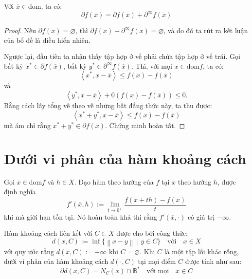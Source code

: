 \begin{lemma}
    Với $\overline{x} \in \text{dom}$, ta có:
    \begin{equation}
        \partial f(\overline{x}) = \partial f(\overline{x}) + \partial^{\infty}f(\overline{x})
    \end{equation}
\end{lemma}
\begin{proof}
    Nếu $\partial f(\overline{x}) = \varnothing$, thì $\partial f(\overline{x}) + \partial^{\infty}f(\overline{x}) = \varnothing$, và do đó ta rút ra kết luận của bổ đề là điều hiển nhiên.

    Ngược lại, đầu tiên ta nhận thấy tập hợp ở vế phải chứa tập hợp ở vế trái. Gọi bất kỳ $x^* \in \partial f(\overline{x})$, bất kỳ $y^* \in \partial^{\infty}f(\overline{x})$. Thì, với mọi $x \in \text{dom}f$, ta có:
    \begin{equation}
        \left \langle x^*, x - \overline{x} \right \rangle \leq f(x) - f(\overline{x})
    \end{equation}
    và
    \begin{equation}
        \left \langle y^*, x - \overline{x} \right \rangle + 0(f(x) - f(\overline{x})) \leq 0.
    \end{equation}
    Bằng cách lấy tổng vế theo vế những bất đẳng thức này, ta thu được:
    \begin{equation}
        \left \langle x^* + y^*, x - \overline{x} \right \rangle \leq f(x) - f(\overline{x})
    \end{equation}
    mà ám chỉ rằng $x^* + y^* \in \partial f(\overline{x})$. Chứng minh hoàn tất.
\end{proof}

\section{Dưới vi phân của hàm khoảng cách}

Gọi $\overline{x} \in \text{dom}f$ và $h \in X$. Đạo hàm theo hướng của $f$ tại $\overline{x}$ theo hướng $h$, được định nghĩa
\begin{equation}
    f'(\overline{x}, h) := \lim_{t \rightarrow 0^{+}}\dfrac{f(\overline{x}+th)-f(\overline{x})}{t}
\end{equation}
khi mà giới hạn tồn tại. Nó hoàn toàn khả thi rằng $f'(\overline{x}, \cdot)$ có giá trị $-\infty$.

Hàm khoảng cách liên kết với $C \subset X$ được cho bởi công thức:
\begin{equation}
    d(x, C) := \inf\{\left \| x - y \right \| \mid y \in C\} \quad \text{với}\quad x \in X
\end{equation}
với quy ước rằng $d(x, C) := +\infty$ khi $C = \varnothing$. Khi $C$ là một tập lồi khác rỗng, dưới vi phân của hàm khoảng cách $d(\cdot, C)$ tại mọi điểm $C$ được tính như sau:
\begin{equation}
    \partial d(x, C) = N_C(x) \cap \mathbb{B}^*\quad\text{với mọi}\quad x \in C
\end{equation}

